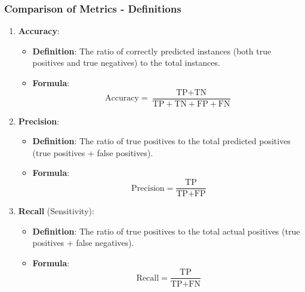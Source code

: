 \documentclass[aspectratio=169]{beamer}
\begin{document}
\begin{frame}[fragile]
    \frametitle{Comparison of Metrics - Definitions}
    \begin{enumerate}
        \item \textbf{Accuracy}: 
            \begin{itemize}
                \item \textbf{Definition}: The ratio of correctly predicted instances (both true positives and true negatives) to the total instances.
                \item \textbf{Formula}:
                \begin{equation}
                    \text{Accuracy} = \frac{\text{TP} + \text{TN}}{\text{TP} + \text{TN} + \text{FP} + \text{FN}}
                \end{equation}
            \end{itemize}
        \item \textbf{Precision}:
            \begin{itemize}
                \item \textbf{Definition}: The ratio of true positives to the total predicted positives (true positives + false positives). 
                \item \textbf{Formula}:
                \begin{equation}
                    \text{Precision} = \frac{\text{TP}}{\text{TP} + \text{FP}}
                \end{equation}
            \end{itemize}
        \item \textbf{Recall} (Sensitivity):
            \begin{itemize}
                \item \textbf{Definition}: The ratio of true positives to the total actual positives (true positives + false negatives). 
                \item \textbf{Formula}:
                \begin{equation}
                    \text{Recall} = \frac{\text{TP}}{\text{TP} + \text{FN}}
                \end{equation}
            \end{itemize}
    \end{enumerate}
\end{frame}
\end{document}
